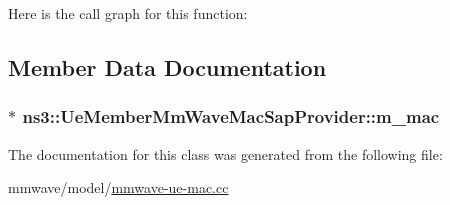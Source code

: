 Here is the call graph for this function\+:




\subsection{Member Data Documentation}
\subsubsection[{\texorpdfstring{m\+\_\+mac}{m_mac}}]{$\ast$ ns3\+::\+Ue\+Member\+Mm\+Wave\+Mac\+Sap\+Provider\+::m\+\_\+mac\hspace{0.3cm}{\ttfamily [private]}}\hypertarget{classns3_1_1UeMemberMmWaveMacSapProvider_a9af89125b0671d9f93cf574d81b09d51}{}\label{classns3_1_1UeMemberMmWaveMacSapProvider_a9af89125b0671d9f93cf574d81b09d51}


The documentation for this class was generated from the following file\+:\begin{DoxyCompactItemize}
\item 
mmwave/model/\hyperlink{mmwave-ue-mac_8cc}{mmwave-\/ue-\/mac.\+cc}\end{DoxyCompactItemize}
